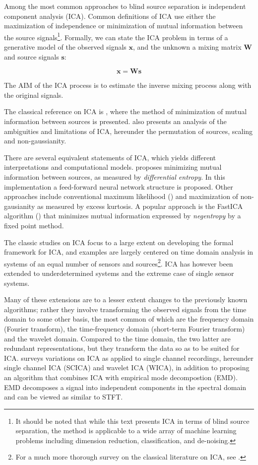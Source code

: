 Among the most common approaches to blind source separation is
independent component analysis (ICA). Common definitions of ICA use
either the maximization of independence or minimization of mutual information between the source
signals\footnote{It should be noted that while this text presents ICA
  in terms of blind source separation, the method is applicable to a
  wide array of machine learning problems including dimension
  reduction, classification, and de-noising.}. Formally, we can state
the ICA problem in terms of a generative model of the observed signals
$\mathbf{x}$, and the unknown a mixing matrix $\mathbf{W}$ and source
signals $\mathbf{s}$:


\begin{equation}
  \mathbf{x} =   \mathbf{W}  \mathbf{s}
\end{equation}

The AIM of the ICA process is to estimate the inverse mixing process
along with the original signals.

The classical reference on ICA
is \cite{comon94}, where the method of minimization of mutual
information between sources is presented. \cite{comon94} also presents an
analysis of the ambiguities and limitations of ICA, hereunder the permutation of
sources, scaling and non-gaussianity. 

There are several equivalent statements of ICA, which yields different
interpretations and computational models.
\cite{bellSejnowski95} proposes minimizing mutual information between
sources, as measured by \emph{differential entropy}. In this
implementation a feed-forward neural network structure is proposed.
Other approaches include conventional maximum likelihood (\cite{pearlmutterParra}) and maximization of
non-gausianity as measured by excess kurtosis. A popular approach is
the  FastICA algorithm (\cite{fastICA}) that minimizes mutual
information expressed by \emph{negentropy} by a fixed point method. 

The classic studies on ICA focus to a large extent on developing the
formal framework for ICA, and examples are largely centered on time
domain analysis in systems of an equal number of sensors and
sources\footnote{For a much more thorough survey on the classical literature 
on ICA, see \cite{hyvarinen2001}.}. ICA has however been extended to underdetermined systems and
the extreme case of single sensor systems. 

Many of these extensions are to a lesser extent changes to the
previously known algorithms; rather they involve transforming
the observed signals from the time domain to some other basis, the
most common of which are the frequency domain (Fourier transform), the
time-frequency domain (short-term Fourier transform) and the wavelet
domain. Compared to the time domain, the two latter are redundant
representations, but they transform the data so as to be suited for
ICA. \cite{mijovic2010} surveys variations on ICA as applied to single
channel recordings, hereunder single channel ICA (SCICA) and wavelet
ICA (WICA), in addition to proposing an algorithm that combines ICA
with empirical mode decompostion (EMD). EMD decomposes a signal into
independent components in the spectral domain and can be viewed as
similar to STFT.

